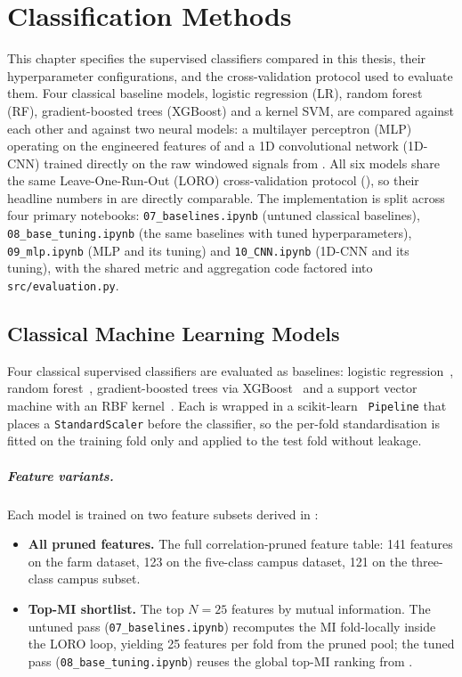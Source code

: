 \chapter{Classification Methods}
\label{ch:classification}

This chapter specifies the supervised classifiers compared in this thesis, their hyperparameter configurations, and the cross-validation protocol used to evaluate them. Four classical baseline models, logistic regression (LR), random forest (RF), gradient-boosted trees (XGBoost) and a kernel SVM, are compared against each other and against two neural models: a multilayer perceptron (MLP) operating on the engineered features of  and a 1D convolutional network (1D-CNN) trained directly on the raw windowed signals from . All six models share the same Leave-One-Run-Out (LORO) cross-validation protocol (), so their headline numbers in  are directly comparable. The implementation is split across four primary notebooks: \texttt{07\_baselines.ipynb} (untuned classical baselines), \texttt{08\_base\_tuning.ipynb} (the same baselines with tuned hyperparameters), \texttt{09\_mlp.ipynb} (MLP and its tuning) and \texttt{10\_CNN.ipynb} (1D-CNN and its tuning), with the shared metric and aggregation code factored into \texttt{src/evaluation.py}.

\section{Classical Machine Learning Models}
\label{sec:classical_models}

Four classical supervised classifiers are evaluated as baselines: logistic regression~\cite{Hosmer2013}, random forest~\cite{Breiman2001}, gradient-boosted trees via XGBoost~\cite{Chen2016} and a support vector machine with an RBF kernel~\cite{Cortes1995}. Each is wrapped in a scikit-learn~\cite{Pedregosa2011} \texttt{Pipeline} that places a \texttt{StandardScaler} before the classifier, so the per-fold standardisation is fitted on the training fold only and applied to the test fold without leakage.

\paragraph{Feature variants.}
Each model is trained on two feature subsets derived in :
\begin{itemize}
    \item \textbf{All pruned features.} The full correlation-pruned feature table: 141 features on the farm dataset, 123 on the five-class campus dataset, 121 on the three-class campus subset.
    \item \textbf{Top-MI shortlist.} The top $N=25$ features by mutual information. The untuned pass (\texttt{07\_baselines.ipynb}) recomputes the MI fold-locally inside the LORO loop, yielding 25 features per fold from the pruned pool; the tuned pass (\texttt{08\_base\_tuning.ipynb}) reuses the global top-MI ranking from .
\end{itemize}

